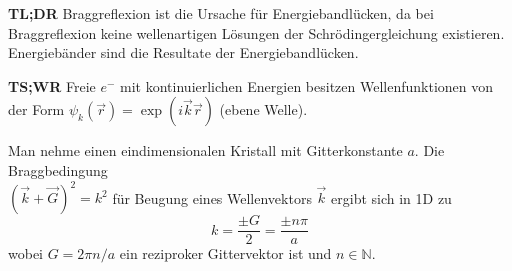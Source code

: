 \label{q:37}

\textbf{TL;DR} Braggreflexion ist die Ursache für Energiebandlücken, da bei Braggreflexion keine wellenartigen Lösungen der Schrödingergleichung existieren.
Energiebänder sind die Resultate der Energiebandlücken.

\textbf{TS;WR} Freie $e^-$ mit kontinuierlichen Energien besitzen Wellenfunktionen von der Form $\psi_{k}(\vec{r}) = \exp(i\vec{k}\vec{r})$ (ebene Welle).

Man nehme einen eindimensionalen Kristall mit Gitterkonstante $a$.
Die Braggbedingung\\$\left(\vec{k} + \vec{G}\right)^2 = k^2$ für Beugung eines Wellenvektors $\vec{k}$ ergibt sich in 1D zu
\begin{equation}
    k = \frac{\pm G}{2} = \frac{\pm n \pi}{a}
\end{equation}
wobei $G = 2\pi n/a$ ein reziproker Gittervektor ist und $n \in \mathbb{N}$.

